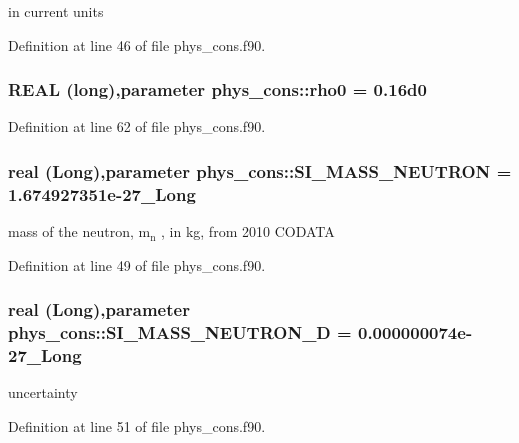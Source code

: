 in current units 



Definition at line 46 of file phys\_\-cons.f90.

\hypertarget{namespacephys__cons_a4b10513970a98ad78b85723c60d9a8b6}{
\subsubsection[{rho0}]{\setlength{\rightskip}{0pt plus 5cm}REAL (long),parameter {\bf phys\_\-cons::rho0} = 0.16d0}}
\label{namespacephys__cons_a4b10513970a98ad78b85723c60d9a8b6}


Definition at line 62 of file phys\_\-cons.f90.

\hypertarget{namespacephys__cons_ab117ad83bb79e4ed199d17f3c63ec4b3}{
\subsubsection[{SI\_\-MASS\_\-NEUTRON}]{\setlength{\rightskip}{0pt plus 5cm}real (Long),parameter {\bf phys\_\-cons::SI\_\-MASS\_\-NEUTRON} = 1.674927351e-\/27\_\-Long}}
\label{namespacephys__cons_ab117ad83bb79e4ed199d17f3c63ec4b3}


mass of the neutron, m$_{\mbox{n}}$ , in kg, from 2010 CODATA 



Definition at line 49 of file phys\_\-cons.f90.

\hypertarget{namespacephys__cons_af635c94d544c5bc6dcb05186a9f81d84}{
\subsubsection[{SI\_\-MASS\_\-NEUTRON\_\-D}]{\setlength{\rightskip}{0pt plus 5cm}real (Long),parameter {\bf phys\_\-cons::SI\_\-MASS\_\-NEUTRON\_\-D} = 0.000000074e-\/27\_\-Long}}
\label{namespacephys__cons_af635c94d544c5bc6dcb05186a9f81d84}


uncertainty 



Definition at line 51 of file phys\_\-cons.f90.

